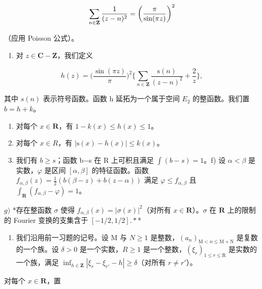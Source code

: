 \[
\sum_ {n \in {\bf Z}} \frac {1}{(z - n) ^ {2}} = \left(\frac {\pi}{\sin (\pi z)}\right) ^ {2}
\]

（应用 Poisson 公式）。

\begin{enumerate}
\def\labelenumi{\alph{enumi})}
\setcounter{enumi}{1}
\tightlist
\item
  对 \(z \in \mathbf{C} - \mathbf{Z}\)，我们定义
\end{enumerate}

\[
h (z) = \Big (\frac {\sin (\pi z)}{\pi} \Big) ^ {2} \Big \{\sum_ {n \in \mathbf {Z}} \frac {\mathrm{s} (n)}{(z - n) ^ {2}} + \frac {2}{z} \Big \},
\]

其中 \(s(n)\) 表示符号函数。函数 h 延拓为一个属于空间 \(E_{2}\) 的整函数。我们置 \(b = h + k\)。

\begin{enumerate}
\def\labelenumi{\alph{enumi})}
\setcounter{enumi}{2}
\item
  对每个 \(x \in \mathbf{R}\)，有 \(1 - k(x) \leqslant h(x) \leqslant 1\)。
\item
  对每个 \(x \in R\)，有 \(|\mathrm{s}(x) - h(x)| \leqslant k(x)\)。
\item
    我们有 \(b \geqslant s\)；函数 b−s 在 R 上可积且满足 \(\int(b - s) = 1\)。f) 设 \(\alpha < \beta\) 是实数，\(\varphi\) 是区间 \([\alpha, \beta]\) 的特征函数。函数 \(f_{\alpha,\beta}(z) = \frac{1}{2}(b(\beta - z) + b(z - \alpha))\) 满足 \(\varphi \leqslant f_{\alpha,\beta}\) 且 \(\int_{\mathbf{R}}(f_{\alpha,\beta} - \varphi) = 1\)。
\end{enumerate}

\(g)\) *存在整函数 \(\sigma\) 使得 \(f_{\alpha,\beta}(x)=|\sigma(x)|^{2}\)（对所有 \(x\in\mathbf{R}\)）。\(\sigma\) 在 \(\mathbf{R}\) 上的限制的 Fourier 变换的支集含于 \([-1/2,1/2].*\)*

\begin{enumerate}
\def\labelenumi{\arabic{enumi})}
\setcounter{enumi}{56}
\tightlist
\item
  我们沿用前一习题的记号。设 M 与 \(N \geqslant 1\) 是整数，\((a_{n})_{\mathrm{M} < n \leqslant \mathrm{M} + \mathrm{N}}\) 是复数的一个族。设 \(\delta > 0\) 是一个实数，\(R \geqslant 1\) 是一个整数，\((\xi_{r})_{1 \leqslant r \leqslant \mathrm{R}}\) 是实数的一个族，满足 \(\inf_{h \in \mathbf{Z}} |\xi_{r} - \xi_{r'} - h| \geqslant \delta\)（对所有 \(r \neq r'\)）。
\end{enumerate}

对每个 \(x\in \mathbf{R}\)，置


